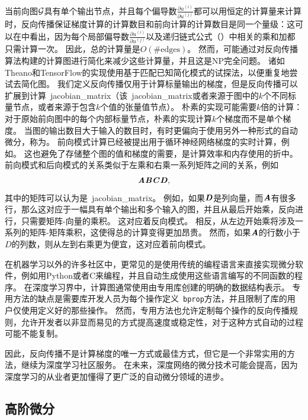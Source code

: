 当前向图$\mathcal{G}$具有单个输出节点，并且每个偏导数$\frac{\partial u^{(i)}}{\partial u^{(j)}}$都可以用恒定的计算量来计算时，反向传播保证梯度计算的计算数目和前向计算的计算数目是同一个量级：这可以在中看出，因为每个局部偏导数$\frac{\partial u^{(i)}}{\partial u^{(j)}}$以及递归链式公式（）中相关的乘和加都只需计算一次。
因此，总的计算量是$O(\#\text{edges})$。
然而，可能通过对反向传播算法构建的计算图进行简化来减少这些计算量，并且这是NP完全问题。
诸如Theano和TensorFlow的实现使用基于匹配已知简化模式的试探法，以便重复地尝试去简化图。
我们定义反向传播仅用于计算标量输出的梯度，但是反向传播可以扩展到计算~\gls{jacobian_matrix}（该~\gls{jacobian_matrix}或者来源于图中的$k$个不同标量节点，或者来源于包含$k$个值的张量值节点）。
朴素的实现可能需要$k$倍的计算：对于原始前向图中的每个内部标量节点，朴素的实现计算$k$个梯度而不是单个梯度。
当图的输出数目大于输入的数目时，有时更偏向于使用另外一种形式的自动微分，称为。
前向模式计算已经被提出用于循环神经网络梯度的实时计算，例如\citep{Williams89b}。
这也避免了存储整个图的值和梯度的需要，是计算效率和内存使用的折中。
前向模式和后向模式的关系类似于左乘和右乘一系列矩阵之间的关系，例如
\begin{equation}
  \boldsymbol{\mathit{A}} \boldsymbol{\mathit{B}} \boldsymbol{\mathit{C}} \boldsymbol{\mathit{D}},
\end{equation}
其中的矩阵可以认为是~\gls{jacobian_matrix}。
例如，如果$\boldsymbol{\mathit{D}}$是列向量，而$\boldsymbol{\mathit{A}}$有很多行，那么这对应于一幅具有单个输出和多个输入的图，并且从最后开始乘，反向进行，只需要矩阵-向量的乘积。
这对应着反向模式。
相反，从左边开始乘将涉及一系列的矩阵-矩阵乘积，这使得总的计算变得更加昂贵。
然而，如果$\boldsymbol{\mathit{A}}$的行数小于$D$的列数，则从左到右乘更为便宜，这对应着前向模式。

在机器学习以外的许多社区中，更常见的是使用传统的编程语言来直接实现微分软件，例如用Python或者C来编程，并且自动生成使用这些语言编写的不同函数的程序。
在深度学习界中，计算图通常使用由专用库创建的明确的数据结构表示。
专用方法的缺点是需要库开发人员为每个操作定义~\verb|bprop|方法，并且限制了库的用户仅使用定义好的那些操作。
然而，专用方法也允许定制每个操作的反向传播规则，允许开发者以非显而易见的方式提高速度或稳定性，对于这种方式自动的过程可能不能复制。

因此，反向传播不是计算梯度的唯一方式或最佳方式，但它是一个非常实用的方法，继续为深度学习社区服务。 
在未来，深度网络的微分技术可能会提高，因为深度学习的从业者更加懂得了更广泛的自动微分领域的进步。
  
  
\subsection{高阶微分}
\label{sec:higher_order_derivatives}

